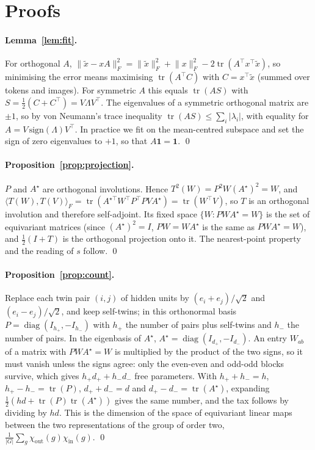 \section{Proofs}
\label{app:proofs}

\paragraph{Lemma~\ref{lem:fit}.} For orthogonal $A$, $\lVert \tilde{x} - xA\rVert_F^2 = \lVert\tilde{x}\rVert_F^2 +
\lVert x\rVert_F^2 - 2\operatorname{tr}(A^\top x^\top \tilde{x})$, so minimising the error means maximising
$\operatorname{tr}(A^\top C)$ with $C = x^\top\tilde{x}$ (summed over tokens and images). For symmetric $A$ this equals
$\operatorname{tr}(A S)$ with $S = \tfrac12(C + C^\top) = V\Lambda V^\top$. The eigenvalues of a symmetric orthogonal
matrix are $\pm1$, so by von Neumann's trace inequality $\operatorname{tr}(AS) \le \sum_i |\lambda_i|$, with equality
for $A = V\,\mathrm{sign}(\Lambda)V^\top$. In practice we fit on the mean-centred subspace and set the sign of zero
eigenvalues to $+1$, so that $A\mathbf{1} = \mathbf{1}$. \qed

\paragraph{Proposition~\ref{prop:projection}.} $P$ and $A^\star$ are orthogonal involutions. Hence
$T^2(W) = P^2 W (A^\star)^2 = W$, and $\langle T(W), T(V)\rangle_F = \operatorname{tr}(A^{\star\top} W^\top P^\top P V
A^\star) = \operatorname{tr}(W^\top V)$, so $T$ is an orthogonal involution and therefore self-adjoint. Its fixed space
$\{W : PWA^\star = W\}$ is the set of equivariant matrices (since $(A^\star)^2 = I$, $PW = WA^\star$ is the same as
$PWA^\star = W$), and $\tfrac12(I + T)$ is the orthogonal projection onto it. The nearest-point property and the
reading of $s$ follow. \qed

\paragraph{Proposition~\ref{prop:count}.} Replace each twin pair $(i,j)$ of hidden units by $(e_i + e_j)/\sqrt2$ and
$(e_i - e_j)/\sqrt2$, and keep self-twins; in this orthonormal basis $P = \operatorname{diag}(I_{h_+}, -I_{h_-})$ with
$h_+$ the number of pairs plus self-twins and $h_-$ the number of pairs. In the eigenbasis of $A^\star$,
$A^\star = \operatorname{diag}(I_{d_+}, -I_{d_-})$. An entry $W_{ab}$ of a matrix with $PWA^\star = W$ is multiplied
by the product of the two signs, so it must vanish unless the signs agree: only the even-even and odd-odd blocks
survive, which gives $h_+d_+ + h_-d_-$ free parameters. With $h_+ + h_- = h$, $h_+ - h_- = \operatorname{tr}(P)$,
$d_+ + d_- = d$ and $d_+ - d_- = \operatorname{tr}(A^\star)$, expanding $\tfrac12\left(hd +
\operatorname{tr}(P)\operatorname{tr}(A^\star)\right)$ gives the same number, and the tax follows by dividing by $hd$.
This is the dimension of the space of equivariant linear maps between the two representations of the group of order
two, $\tfrac1{|G|}\sum_g \chi_{\mathrm{out}}(g)\chi_{\mathrm{in}}(g)$. \qed

